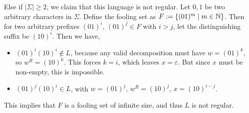 \documentclass[12pt]{article}
\begin{document}
\begin{solution}
\begin{enumerate}
            \begin{center}
            \end{center}
            
        Else if $|\Sigma| \geq 2$, we claim that this language is not regular. Let $0, 1$ be two arbitrary characters in $\Sigma$. 
        Define the fooling set as $F := \{(01)^m \mid m \in \mathbb N\}$.  Then for two arbitrary prefixes $(01)^i, \, (01)^j \in F$ with $i > j$, let the distinguishing suffix be $(10)^i$.  Then we have, 
        \begin{itemize}
            \item $(01)^i(10)^i \notin L$, because any valid decomposition must have $w=(01)^k$, so $w^R=(10)^k$. This forces $k=i$, which leaves $x=\varepsilon$. But since $x$ must be non-empty, this is impossible. 
            \item $(01)^j(10)^i \in  L$, with $w = (01)^j, \, w^R = (10)^{j}, \, x = (10)^{i-j}$. 
        \end{itemize}
        This implies that $F$ is a fooling set of infinite size, and thus $L$ is not regular.

    \end{enumerate}
\end{solution}
\end{document}
